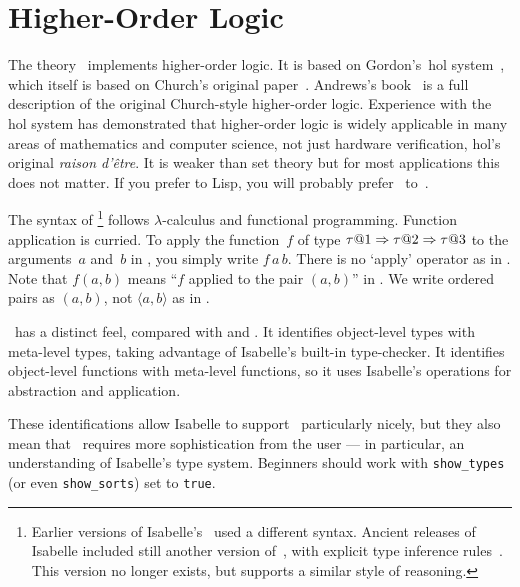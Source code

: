 \chapter{Higher-Order Logic}

The theory~ implements higher-order logic.  It is based on
Gordon's~{\sc hol} system~\cite{mgordon-hol}, which itself is based on
Church's original paper~\cite{church40}.  Andrews's
book~\cite{andrews86} is a full description of the original
Church-style higher-order logic.  Experience with the {\sc hol} system
has demonstrated that higher-order logic is widely applicable in many
areas of mathematics and computer science, not just hardware
verification, {\sc hol}'s original \textit{raison d'\^etre\/}.  It is
weaker than {\ZF} set theory but for most applications this does not
matter.  If you prefer {\ML} to Lisp, you will probably prefer \HOL\ 
to~{\ZF}.

The syntax of \HOL\footnote{Earlier versions of Isabelle's \HOL\ used a
different syntax.  Ancient releases of Isabelle included still another version
of~\HOL, with explicit type inference rules~\cite{paulson-COLOG}.  This
version no longer exists, but \thydx{ZF} supports a similar style of
reasoning.} follows $\lambda$-calculus and functional programming.  Function
application is curried.  To apply the function~$f$ of type
$\tau@1\To\tau@2\To\tau@3$ to the arguments~$a$ and~$b$ in \HOL, you simply
write $f\,a\,b$.  There is no `apply' operator as in \thydx{ZF}.  Note that
$f(a,b)$ means ``$f$ applied to the pair $(a,b)$'' in \HOL.  We write ordered
pairs as $(a,b)$, not $\langle a,b\rangle$ as in {\ZF}.

\HOL\ has a distinct feel, compared with {\ZF} and {\CTT}.  It
identifies object-level types with meta-level types, taking advantage of
Isabelle's built-in type-checker.  It identifies object-level functions
with meta-level functions, so it uses Isabelle's operations for abstraction
and application.

These identifications allow Isabelle to support \HOL\ particularly
nicely, but they also mean that \HOL\ requires more sophistication
from the user --- in particular, an understanding of Isabelle's type
system.  Beginners should work with \texttt{show_types} (or even
\texttt{show_sorts}) set to \texttt{true}.


